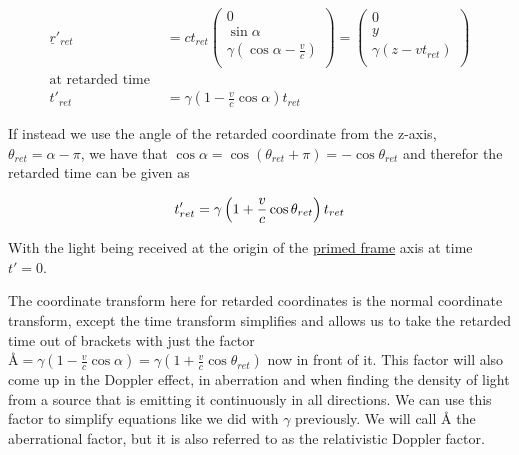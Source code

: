 \begin{equation}
	\begin{aligned}
		\underline{r}'_{ret}     & = {c}{{t}_{ret}}
		\begin{pmatrix}
			0                                                \\
			\sin{\alpha}                                     \\
			{\gamma} \left( \cos{\alpha}-\frac{v}{c} \right) \\
		\end{pmatrix}
		=
		\begin{pmatrix}
			0                                             \\
			{y}                                           \\
			{\gamma} \left( {z}-{v} {{{t}_{ret}}} \right) \\
		\end{pmatrix}
		\\
		\text{at retarded time } &
		\\ {{t}'_{ret}} & = {\gamma} \left(1-\frac{v}{c} \cos{\alpha} \right) {{{t}_{ret}}}
	\end{aligned}
\end{equation}

If instead we use the angle of the retarded coordinate from the z-axis, $\theta_{ret} = \alpha - \pi$, we have that $\cos{\alpha}=\cos{(\theta_{ret}+\pi)}=-\cos{\theta_{ret}}$ and therefor the retarded time can be given as

\begin{equation}
	\\ {{t}'_{ret}} = {\gamma} \left(1 + \frac{v}{c} \cos{\theta_{ret}} \right) {{{t}_{ret}}}
\end{equation}

With the light being received at the origin of the \hyperlink{def-Primed-Frame}{primed frame} axis at time ${t{'}} = 0$.

The coordinate transform here for retarded coordinates is the normal coordinate transform, except the time transform simplifies and allows us to take the retarded time out of brackets with just the factor $\text{\AA}={\gamma} \left(1-\frac{v}{c} \cos{\alpha} \right) = {\gamma} \left(1 + \frac{v}{c} \cos{\theta_{ret}} \right)$ now in front of it.
This factor will also come up in the Doppler effect, in aberration and when finding the density of light from a source that is emitting it continuously in all directions.
We can use this factor to simplify equations like we did with $\gamma$ previously.
We will call $\text{\AA}$ the aberrational factor, but it is also referred to as the relativistic Doppler factor.

